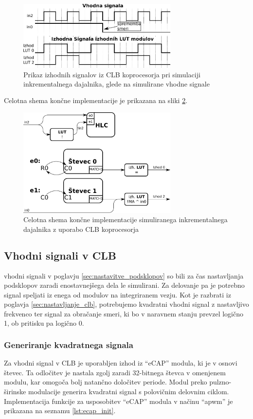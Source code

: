 \documentclass[a4paper]{article}
\begin{document}
\begin{figure}[htb]
    \centerline{\includegraphics[width=8cm]{obracanje_smeri_potek}}
    \caption{Prikaz izhodnih signalov iz CLB koprocesorja pri simulaciji inkrementalnega dajalnika, glede na simulirane vhodne signale}
    \label{fig:obracanje_smeri}
\end{figure}

Celotna shema končne implementacije je prikazana na sliki \ref{fig:koncna_shema}.

\begin{figure}[htb]
    \centerline{\includegraphics[width=8cm]{koncna_shema}}
    \caption{Celotna shema končne implementacije simuliranega inkrementalnega dajalnika z uporabo CLB koprocesorja}
    \label{fig:koncna_shema}
\end{figure}

\subsection{Vhodni signali v CLB}
vhodni signali v poglavju \ref{sec:nastavitve_podsklopov} so bili za čas nastavljanja podsklopov zaradi enostavnejšega dela le simulirani. Za delovanje pa je potrebno signal speljati iz enega od modulov na integriranem vezju. Kot je razbrati iz poglavja \ref{sec:nastavljanje_clb}, potrebujemo kvadratni vhodni signal z nastavljivo frekvenco ter signal za obračanje smeri, ki bo v naravnem stanju prevzel logično 1, ob pritisku pa logično 0.

\subsubsection{Generiranje kvadratnega signala}
Za vhodni signal v CLB je uporabljen izhod iz ``eCAP'' modula, ki je v osnovi števec. Ta odločitev je nastala zgolj zaradi 32-bitnega števca v omenjenem modulu, kar omogoča bolj natančno določitev periode. Modul preko pulzno-širinske modulacije generira kvadratni signal s polovičnim delovnim ciklom. Implementacija funkcije za usposobitev ``eCAP'' modula v načinu ``apwm'' je prikazana na seznamu \ref{lst:ecap_init}.
\end{document}
